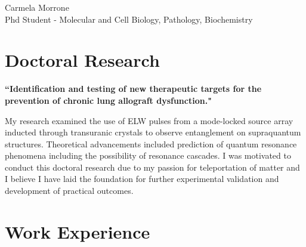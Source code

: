 \documentclass[10pt]{article} %
\begin{document}
\begin{paracol}{2} %


\parbox[top][0.12\textheight][c]{\linewidth}{ %
	\vspace{-0.04\textheight} %
	\centering %
	{\sffamily\Huge Carmela Morrone}\\\medskip %
	{\color{headings} Phd Student - Molecular and Cell Biology, Pathology, Biochemistry}
}


\section{Doctoral Research}

{\raggedright\textbf{``Identification and testing of new therapeutic targets for the prevention of
chronic lung allograft dysfunction."}\\\medskip}

My research examined the use of ELW pulses from a mode-locked source array inducted through transuranic crystals to observe entanglement on supraquantum structures. Theoretical advancements included prediction of quantum resonance phenomena including the possibility of resonance cascades. I was motivated to conduct this doctoral research due to my passion for teleportation of matter and I believe I have laid the foundation for further experimental validation and development of practical outcomes.

\medskip %


\section{Work Experience}


\end{paracol}
\end{document}
